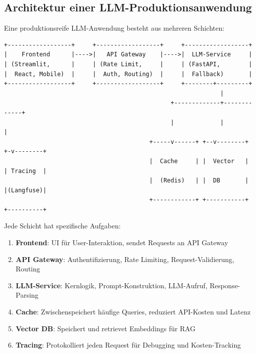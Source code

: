 \subsection{Architektur einer LLM-Produktionsanwendung}

Eine produktionsreife LLM-Anwendung besteht aus mehreren Schichten:

\begin{verbatim}
+------------------+     +------------------+     +------------------+
|    Frontend      |---->|   API Gateway    |---->|  LLM-Service     |
| (Streamlit,      |     | (Rate Limit,     |     | (FastAPI,        |
|  React, Mobile)  |     |  Auth, Routing)  |     |  Fallback)       |
+------------------+     +------------------+     +--------+---------+
                                                             |
                                               +-------------+-------------+
                                               |             |             |
                                         +-----v------+ +--v--------+ +-v--------+
                                         |  Cache     | |  Vector   | | Tracing  |
                                         |  (Redis)   | |  DB       | |(Langfuse)|
                                         +------------+ +-----------+ +----------+
\end{verbatim}

Jede Schicht hat spezifische Aufgaben:

\begin{enumerate}[leftmargin=*]
    \item \textbf{Frontend}: UI für User-Interaktion, sendet Requests an API Gateway
    \item \textbf{API Gateway}: Authentifizierung, Rate Limiting, Request-Validierung, Routing
    \item \textbf{LLM-Service}: Kernlogik, Prompt-Konstruktion, LLM-Aufruf, Response-Parsing
    \item \textbf{Cache}: Zwischenspeichert häufige Queries, reduziert API-Kosten und Latenz
    \item \textbf{Vector DB}: Speichert und retrievet Embeddings für RAG
    \item \textbf{Tracing}: Protokolliert jeden Request für Debugging und Kosten-Tracking
\end{enumerate}


